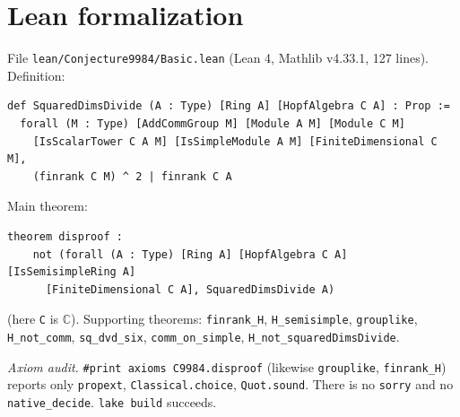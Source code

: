 \documentclass[11pt]{article}
\theoremstyle{definition}
\begin{document}
\section{Lean formalization}
File \texttt{lean/Conjecture9984/Basic.lean} (Lean 4, Mathlib v4.33.1, 127 lines). Definition:
\begin{verbatim}
def SquaredDimsDivide (A : Type) [Ring A] [HopfAlgebra C A] : Prop :=
  forall (M : Type) [AddCommGroup M] [Module A M] [Module C M]
    [IsScalarTower C A M] [IsSimpleModule A M] [FiniteDimensional C M],
    (finrank C M) ^ 2 | finrank C A
\end{verbatim}
Main theorem:
\begin{verbatim}
theorem disproof :
    not (forall (A : Type) [Ring A] [HopfAlgebra C A] [IsSemisimpleRing A]
      [FiniteDimensional C A], SquaredDimsDivide A)
\end{verbatim}
(here \texttt{C} is $\mathbb{C}$). Supporting theorems: \texttt{finrank\_H}, \texttt{H\_semisimple},
\texttt{grouplike}, \texttt{H\_not\_comm}, \texttt{sq\_dvd\_six}, \texttt{comm\_on\_simple},
\texttt{H\_not\_squaredDimsDivide}.

\emph{Axiom audit.} \texttt{\#print axioms C9984.disproof} (likewise \texttt{grouplike},
\texttt{finrank\_H}) reports only \texttt{propext}, \texttt{Classical.choice},
\texttt{Quot.sound}. There is no \texttt{sorry} and no \texttt{native\_decide}.
\texttt{lake build} succeeds.
\end{document}
